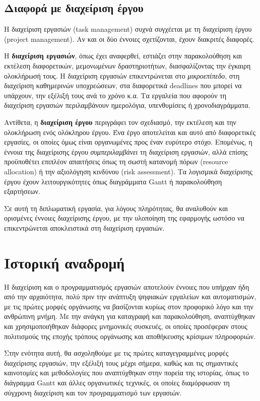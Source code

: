         \subsection{Διαφορά με διαχείριση έργου}
            Η διαχείριση εργασιών (task management) συχνά συγχέεται με τη διαχείριση έργου (project management). Αν και οι δύο έννοιες σχετίζονται, έχουν διακριτές διαφορές.

            Η \textbf{διαχείριση εργασιών}, όπως έχει αναφερθεί, εστιάζει στην παρακολούθηση και εκτέλεση διαφορετικών, μεμονωμένων δραστηριοτήτων, διασφαλίζοντας την έγκαιρη ολοκλήρωσή τους. Η διαχείριση εργασιών επικεντρώνεται στο \textit{μικροεπίπεδο}, στη διαχείριση καθημερινών υποχρεώσεων, στα διαφορετικά deadlines που μπορεί να υπάρχουν, την εξέλιξή τους ανά το χρόνο κ.α. Τα εργαλεία που αφορούν τη διαχείριση εργασιών περιλαμβάνουν ημερολόγια, υπενθυμίσεις ή χρονοδιαγράμματα.

            Αντίθετα, η \textbf{διαχείριση έργου} περιγράφει τον σχεδιασμό, την εκτέλεση και την ολοκλήρωση ενός ολόκληρου έργου. Ένα έργο αποτελείται και αυτό από διαφορετικές εργασίες, οι οποίες όμως είναι οργανωμένες προς έναν ευρύτερο στόχο. Επομένως, η έννοια της διαχείρισης έργου \textit{συμπεριλαμβάνει} τη διαχείριση εργασιών, αλλά επίσης προϋποθέτει επιπλέον απαιτήσεις όπως τη σωστή κατανομή πόρων (resource allocation) ή την αξιολόγηση κινδύνου (risk assessment). Τα λογισμικά διαχείρισης έργου έχουν λειτουργικότητες όπως διαγράμματα Gantt ή παρακολούθηση εξαρτήσεων.

            Σε αυτή τη διπλωματική εργασία, για λόγους πληρότητας, θα αναλυθούν και ορισμένες έννοιες διαχείρισης έργου, με την υλοποίηση της εφαρμογής ωστόσο να επικεντρώνεται αποκλειστικά στη διαχείριση εργασιών.


    \section{Ιστορική αναδρομή}
        Η διαχείριση και ο προγραμματισμός εργασιών αποτελούν έννοιες που υπήρχαν ήδη από την αρχαιότητα, πολύ πριν την ανάπτυξη ψηφιακών εργαλείων και αυτοματισμών, με τις πρώτες μορφές οργάνωσης να βασίζονται κυρίως στον προφορικό λόγο και την ανθρώπινη μνήμη. Με την ανάγκη για καταγραφή και παρακολούθηση, αναπτύχθηκαν και χρησιμοποιήθηκαν διάφορες μνημονικές συσκευές, οι οποίες προσέφεραν στους πολιτισμούς της εποχής τρόπους οργάνωσης και αποθήκευσης κρίσιμων πληροφοριών.

        Στην ενότητα αυτή, θα ασχοληθούμε με τις πρώτες καταγεγραμμένες μορφές διαχείρισης εργασιών, την εξέλιξή τους μέχρι σήμερα, καθώς και τις σημαντικές καινοτομίες και μεθοδολογίες που αναπτύχθηκαν στην πορεία της ιστορίας, όπως το διάγραμμα Gantt και άλλες οργανωτικές τεχνικές, οι οποίες διαμόρφωσαν τη σύγχρονη διαχείριση και τον προγραμματισμό των εργασιών.

